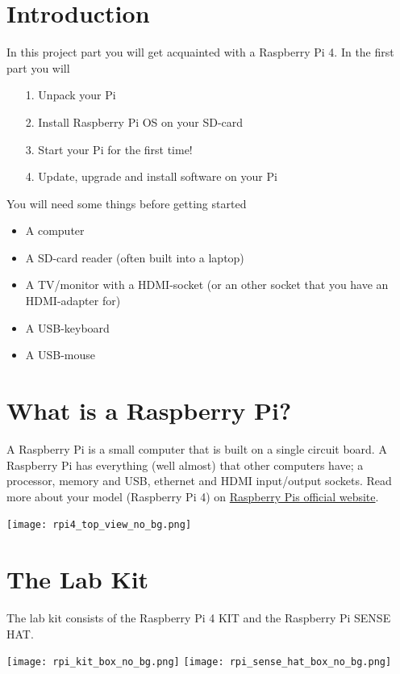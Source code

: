 \documentclass{article}
\begin{document}
\section{Introduction}
In this project part you will get acquainted with a Raspberry Pi 4. 
In the first part you will
\begin{itemize}
\item[1.] Unpack your Pi
\item[2.] Install Raspberry Pi OS on your SD-card
\item[3.] Start your Pi for the first time!
\item[4.] Update, upgrade and install software on your Pi
\end{itemize}

\noindent You will need some things before getting started
\begin{itemize}
    \item A computer
    \item A SD-card reader (often built into a laptop)
    \item A TV/monitor with a HDMI-socket (or an other socket that you have an HDMI-adapter for)
    \item A USB-keyboard
    \item A USB-mouse
\end{itemize}



\section{What is a Raspberry Pi?}
A Raspberry Pi is a small computer that is built on a single circuit board. A Raspberry Pi has everything (well almost) that other computers have; a processor, memory and USB, ethernet and HDMI input/output sockets. Read more about your model (Raspberry Pi 4) on {\color{blue}\href{https://www.raspberrypi.org/products/raspberry-pi-4-model-b/}{Raspberry Pis official website}}.
\begin{center}
\texttt{[image: rpi4\_top\_view\_no\_bg.png]}
\end{center}

\newpage

\section{The Lab Kit}
The lab kit consists of the Raspberry Pi 4 KIT and the Raspberry Pi SENSE HAT. 
\begin{center}
\texttt{[image: rpi\_kit\_box\_no\_bg.png]}
\texttt{[image: rpi\_sense\_hat\_box\_no\_bg.png]}
\end{center}
\end{document}
